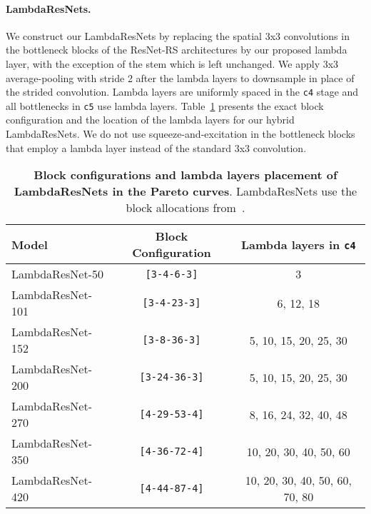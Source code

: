 \documentclass{article} \usepackage{iclr2021_conference,times}
\begin{document}
\vspace{-0.1cm}
\paragraph{LambdaResNets.}
We construct our LambdaResNets by replacing the spatial 3x3 convolutions in the bottleneck blocks of the ResNet-RS architectures by our proposed lambda layer, with the exception of the stem which is left unchanged.
We apply 3x3 average-pooling with stride 2 after the lambda layers to downsample in place of the strided convolution.
Lambda layers are uniformly spaced in the \texttt{c4} stage and all bottlenecks in \texttt{c5} use lambda layers.
Table~\ref{tab:block_config_details} presents the exact block configuration and the location of the lambda layers for our hybrid LambdaResNets.
We do not use squeeze-and-excitation in the bottleneck blocks that employ a lambda layer instead of the standard 3x3 convolution.
    
\begin{table}[h]
    \begin{center}
    \small
    \begin{tabular}{l|cc}
    \toprule
    Model & Block Configuration & Lambda layers in \texttt{c4} \\
    \midrule
    LambdaResNet-50 & \texttt{[3-4-6-3]} & 3 \\
    LambdaResNet-101 & \texttt{[3-4-23-3]} & 6, 12, 18 \\
    LambdaResNet-152 & \texttt{[3-8-36-3]} & 5, 10, 15, 20, 25, 30 \\ 
    LambdaResNet-200 & \texttt{[3-24-36-3]} & 5, 10, 15, 20, 25, 30 \\ 
    LambdaResNet-270 & \texttt{[4-29-53-4]} & 8, 16, 24, 32, 40, 48 \\
    LambdaResNet-350 & \texttt{[4-36-72-4]} & 10, 20, 30, 40, 50, 60 \\
    LambdaResNet-420 & \texttt{[4-44-87-4]} & 10, 20, 30, 40, 50, 60, 70, 80 \\
    \bottomrule
    \end{tabular}
    \end{center}
    \caption{\textbf{Block configurations and lambda layers placement of LambdaResNets in the Pareto curves}.
    LambdaResNets use the block allocations from~\cite{he2015deep,bello2021revisiting}.}
    \label{tab:block_config_details} 
\end{table}
\end{document}
